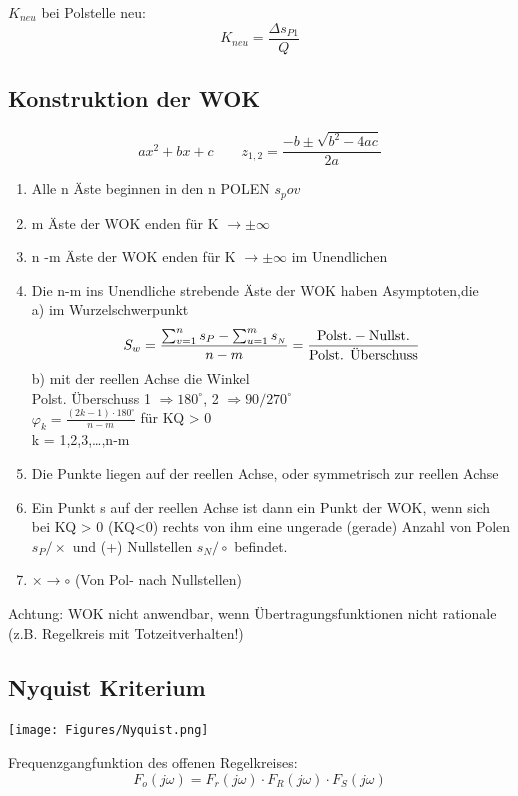$K_{neu}$ bei Polstelle neu:
\[ K_{neu} = \frac{ \Delta s_{P1}}{Q} \]

\subsection{Konstruktion der WOK}

\[ ax^2+bx+c \qquad z_{1,2} = \dfrac{-b \pm \sqrt{b^2 -4ac}}{2a}\]

\begin{mdframed}[style=exercise]
	\begin{enumerate}[leftmargin=*]
		\item Alle n Äste beginnen in den n POLEN $s_pov$
		\item m Äste der WOK enden für K $\rightarrow \pm \infty$
		\item n -m Äste der WOK enden für K $\rightarrow \pm \infty$ im Unendlichen
		\item Die n-m ins Unendliche strebende Äste der WOK haben Asymptoten,die\\
		      a) im Wurzelschwerpunkt
		      \[S_{w}=\frac{\sum_{v=1}^{n} s_{P}-\sum_{u=1}^{m} s_{_{N}}}{n-m} 
                        = \dfrac{\textnormal{Polst.}- \textnormal{Nullst.}}{\textnormal{Polst. Überschuss}}\]
		      b) mit der reellen Achse die Winkel\\
			  Polst. Überschuss 1 $\Rightarrow 180^{\circ}$, 2 $\Rightarrow 90/270^{\circ}$\\
		      $\varphi_{k}=\frac{(2 k-1) \cdot 180^{\circ}}{n-m}$ für KQ > 0\\
		      k = 1,2,3,\dots,n-m
		\item Die Punkte liegen auf der reellen Achse, oder symmetrisch zur reellen Achse
		\item Ein Punkt s auf der reellen Achse ist dann ein Punkt der WOK, wenn sich bei KQ > 0 (KQ<0)
		      rechts von ihm eine ungerade (gerade) Anzahl von Polen $s_{P} / \times$ und (+) Nullstellen $s_{N} / \circ$ befindet.
		\item $\times \rightarrow \circ $ (Von Pol- nach Nullstellen)
	\end{enumerate}

	Achtung: WOK nicht anwendbar, wenn Übertragungsfunktionen nicht rationale (z.B. Regelkreis mit Totzeitverhalten!)
\end{mdframed}



\subsection{Nyquist Kriterium}
\begin{center}
	\texttt{[image: Figures/Nyquist.png]}
\end{center}
Frequenzgangfunktion des offenen Regelkreises:
\[
	F_o (j\omega) = F_r (j\omega) \cdot F_R (j\omega) \cdot F_S (j\omega)
\]


